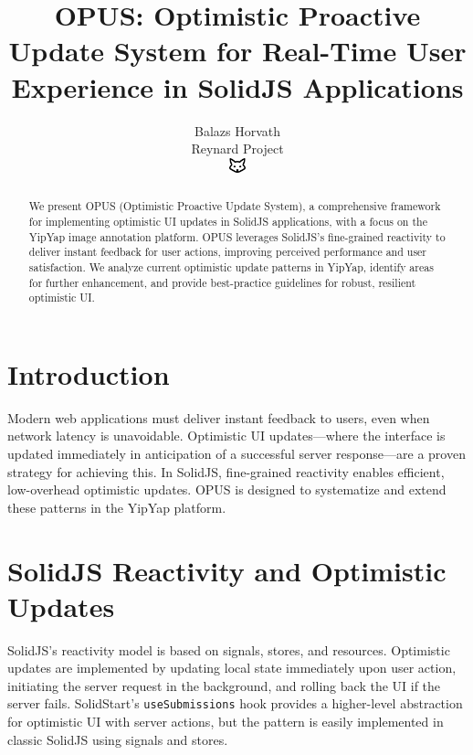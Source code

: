 \documentclass[10pt]{article}
\begin{document}
\title{OPUS: Optimistic Proactive Update System for Real-Time User Experience in SolidJS Applications}

\author{Balazs Horvath\\Reynard Project\\\includegraphics[width=0.5cm]{../../shared-assets/favicon.pdf}}

\maketitle

\begin{abstract}
We present OPUS (Optimistic Proactive Update System), a comprehensive framework for implementing optimistic UI updates in SolidJS applications, with a focus on the YipYap image annotation platform. OPUS leverages SolidJS's fine-grained reactivity to deliver instant feedback for user actions, improving perceived performance and user satisfaction. We analyze current optimistic update patterns in YipYap, identify areas for further enhancement, and provide best-practice guidelines for robust, resilient optimistic UI.
\end{abstract}

\section{Introduction}
Modern web applications must deliver instant feedback to users, even when network latency is unavoidable. Optimistic UI updates---where the interface is updated immediately in anticipation of a successful server response---are a proven strategy for achieving this. In SolidJS, fine-grained reactivity enables efficient, low-overhead optimistic updates. OPUS is designed to systematize and extend these patterns in the YipYap platform.

\section{SolidJS Reactivity and Optimistic Updates}
SolidJS's reactivity model is based on signals, stores, and resources. Optimistic updates are implemented by updating local state immediately upon user action, initiating the server request in the background, and rolling back the UI if the server fails. SolidStart's \texttt{useSubmissions} hook provides a higher-level abstraction for optimistic UI with server actions, but the pattern is easily implemented in classic SolidJS using signals and stores.
\end{document}
